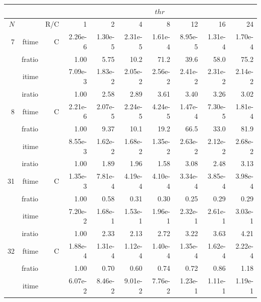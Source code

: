 \documentclass[a4paper]{article}
\begin{document}
\begin{table}[htbp]
\begin{center}
\begin{small}
\begin{tabular}{|r|r|r|r|r|r|r|r|r|r|}
\hline 
     \multicolumn{3}{|c|}{ } & \multicolumn{7}{c|}{$thr$} \\ \hline
    $N$  & & R/C  & 1           & 2    & 4    & 8    & 12   & 16    & 24  \\ \hline\hline
    7  & ftime & C  &  2.26e-6 &   1.30e-5 &   2.31e-5 &   1.61e-4 &   8.95e-5 &   1.31e-4 &   1.70e-4    \\ 
      & fratio & &     1.00 &   5.75 &   10.2 &   71.2 &   39.6 &   58.0 &   75.2     \\ 
     & itime & &       7.09e-3 &   1.83e-2 &   2.05e-2 &   2.56e-2 &   2.41e-2 &   2.31e-2 &   2.14e-2      \\ 
     & iratio & &      1.00 &   2.58 &   2.89 &   3.61 &   3.40 &   3.26 &   3.02        \\ \hline 
    8  & ftime & C  &  2.21e-6 &   2.07e-5 &   2.24e-5 &   4.24e-5 &   1.47e-4 &   7.30e-5 &   1.81e-4      \\ 
      & fratio & &     1.00 &   9.37 &   10.1 &   19.2 &   66.5 &   33.0 &   81.9      \\ 
     & itime & &       8.55e-3 &   1.62e-2 &   1.68e-2 &   1.35e-2 &   2.63e-2 &   2.12e-2 &   2.68e-2       \\ 
     & iratio & &      1.00 &   1.89 &   1.96 &   1.58 &   3.08 &   2.48 &   3.13        \\ \hline 
   31  & ftime & C  &  1.35e-3 &   7.81e-4 &   4.19e-4 &   4.10e-4 &   3.34e-4 &   3.85e-4 &   3.98e-4     \\ 
      & fratio & &     1.00 &   0.58 &   0.31 &   0.30 &   0.25 &   0.29 &   0.29      \\ 
     & itime & &       7.20e-2 &   1.68e-1 &   1.53e-1 &   1.96e-1 &   2.32e-1 &   2.61e-1 &   3.03e-1     \\ 
     & iratio & &      1.00 &   2.33 &   2.13 &   2.72 &   3.22 &   3.63 &   4.21         \\ \hline 
   32  & ftime & C  &  1.88e-4 &   1.31e-4 &   1.12e-4 &   1.40e-4 &   1.35e-4 &   1.62e-4 &   2.22e-4    \\ 
      & fratio & &     1.00 &   0.70 &   0.60 &   0.74 &   0.72 &   0.86 &   1.18      \\ 
     & itime & &       6.07e-2 &   8.46e-2 &   9.01e-2 &   7.76e-2 &   1.23e-1 &   1.11e-1 &   1.19e-1        \\ 

\end{tabular}
\end{small}
\end{center}
\end{table}
\end{document}
